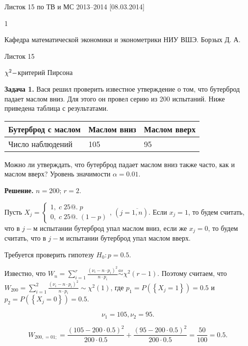

Листок 15 по ТВ и МС 2013--2014 [08.03.2014]







1

Кафедра математической экономики и эконометрики НИУ ВШЭ. Борзых Д. А.

Листок 15

$\chi ^{2} {\rm -}$критерий Пирсона



\textbf{Задача 1.} Вася решил проверить известное утверждение о том, что бутерброд падает маслом вниз. Для этого он провел серию из 200 испытаний. Ниже приведена таблица с результатами.

\begin{tabular}{|p{1.1in}|p{0.8in}|p{0.8in}|} \hline 
Бутерброд с маслом & Маслом вниз & Маслом вверх \\ \hline 
Число наблюдений & 105 & 95 \\ \hline 
\end{tabular}

Можно ли утверждать, что бутерброд падает маслом вниз также часто, как и маслом вверх? Уровень значимости $\alpha =0.01$.



\textbf{Решение.} $n=200$; $r=2$.\underbar{}

Пусть $X_{j} =\left\{\begin{array}{l} {1,\; c\; 25@.\; p} \\ {0,\; c\; 25@.\; \left(1-p\right)} \end{array}\right. $, $\left(j=\overline{1,n}\right)$. Если $x_{j} =1$, то будем считать, что в $j-$м испытании бутерброд упал маслом вниз, если же $x_{j} =0$, то будем считать, что в $j-$м испытании бутерброд упал маслом вверх.

Требуется проверить гипотезу $H_{0} :p=0.5$.

Известно, что $W_{n} =\sum _{i=1}^{r}\frac{\left(\nu _{i} -n\cdot p_{i} \right)^{2} }{n\cdot p_{i} }  \mathop{\sim }\limits^{as} \chi ^{2} \left(r-1\right)$. Поэтому считаем, что $W_{200} =\sum _{i=1}^{2}\frac{\left(\nu _{i} -n\cdot p_{i} \right)^{2} }{n\cdot p_{i} }  \sim \chi ^{2} \left(1\right)$, где $p_{1} =P\left(\left\{X_{j} =1\right\}\right)=0.5$ и $p_{2} =P\left(\left\{X_{j} =0\right\}\right)=0.5$.

\[\nu _{1} =105, \nu _{2} =95.\] 

\[W_{200,=01;} =\frac{\left(105-200\cdot 0.5\right)^{2} }{200\cdot 0.5} +\frac{\left(95-200\cdot 0.5\right)^{2} }{200\cdot 0.5} =\frac{50}{100} =0.5.\] 

